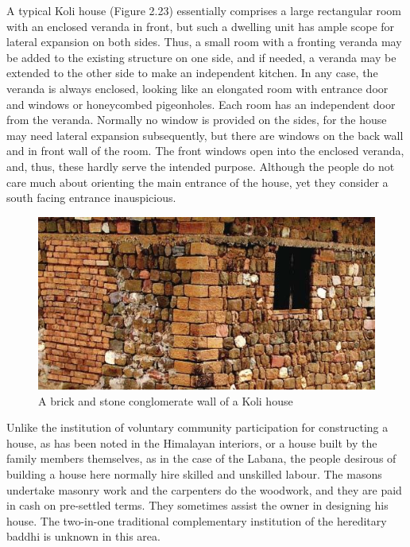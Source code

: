 A typical Koli house (Figure 2.23) essentially comprises a large rectangular room with an enclosed veranda in front, but such a dwelling unit has ample scope for lateral expansion on both sides. Thus, a small room with a fronting veranda may be added to the existing structure on one side, and if needed, a veranda may be extended to the other side to make an independent kitchen. In any case, the veranda is always enclosed, looking like an elongated room with entrance door and windows or honeycombed pigeonholes. Each room has an independent door from the veranda. Normally no window is provided on the sides, for the house may need lateral expansion subsequently, but there are windows on the back wall and in front wall of the room. The front windows open into the enclosed veranda, and, thus, these hardly serve the intended purpose. Although the people do not care much about orienting the main entrance of the house, yet they consider a south facing entrance inauspicious.

\begin{figure}[!htbp]
\includegraphics[scale=.53]{images/chap02-23.jpg}
\caption{A brick and stone conglomerate wall of a Koli house}\label{chap02-fig23}
\end{figure}

Unlike the institution of voluntary community participation for constructing a house, as has been noted in the Himalayan interiors, or a house built by the family members themselves, as in the case of the Labana, the people desirous of building a house here normally hire skilled and unskilled labour. The masons undertake masonry work and the carpenters do the woodwork, and they are paid in cash on pre-settled terms. They sometimes assist the owner in designing his house. The two-in-one traditional complementary institution of the hereditary baddhi is unknown in this area.

